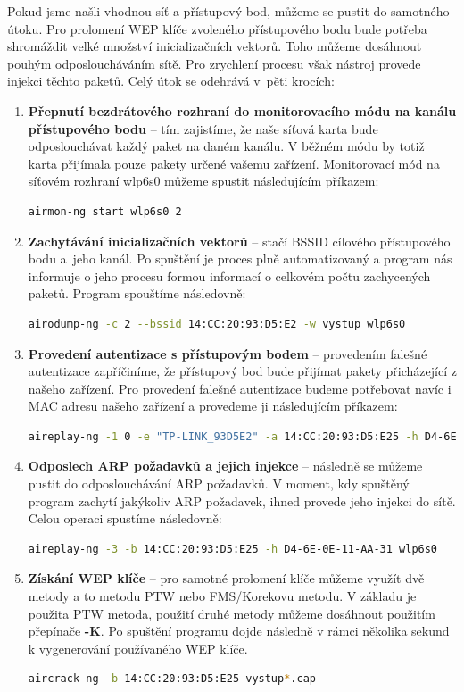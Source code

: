 Pokud jsme našli vhodnou síť a přístupový bod, můžeme se pustit do samotného útoku. Pro prolomení WEP klíče zvoleného přístupového bodu bude potřeba shromáždit velké množství inicializačních vektorů. Toho můžeme dosáhnout pouhým odposloucháváním sítě. Pro zrychlení procesu však nástroj provede injekci těchto paketů. Celý útok se odehrává v~pěti krocích:
\begin{enumerate}
  \item{\textbf{Přepnutí bezdrátového rozhraní do monitorovacího módu na kanálu přístupového bodu} -- tím zajistíme, že naše síťová karta bude odposlouchávat každý paket na daném kanálu. V běžném módu by totiž karta přijímala pouze pakety určené vašemu zařízení. Monitorovací mód na síťovém rozhraní wlp6s0 můžeme spustit následujícím příkazem:
\begin{lstlisting}[language=bash]
airmon-ng start wlp6s0 2
\end{lstlisting}
  }
  \item{\textbf{Zachytávání inicializačních vektorů} -- stačí BSSID cílového přístupového bodu a~jeho kanál. Po spuštění je proces plně automatizovaný a program nás informuje o jeho procesu formou informací o celkovém počtu zachycených paketů. Program spouštíme následovně:
\begin{lstlisting}[language=bash]
airodump-ng -c 2 --bssid 14:CC:20:93:D5:E2 -w vystup wlp6s0
\end{lstlisting}
  }
  \item{\textbf{Provedení autentizace s přístupovým bodem} -- provedením falešné autentizace zapříčiníme, že přístupový bod bude přijímat pakety přicházející z našeho zařízení. Pro provedení falešné autentizace budeme potřebovat navíc i MAC adresu našeho zařízení a provedeme ji následujícím příkazem:
\begin{lstlisting}[language=bash]
aireplay-ng -1 0 -e "TP-LINK_93D5E2" -a 14:CC:20:93:D5:E25 -h D4-6E-0E-11-AA-31
\end{lstlisting}
  }
  \item{\textbf{Odposlech ARP požadavků a jejich injekce} -- následně se můžeme pustit do odposlouchávání ARP požadavků. V moment, kdy spuštěný program zachytí jakýkoliv ARP požadavek, ihned provede jeho injekci do sítě. Celou operaci spustíme následovně:
\begin{lstlisting}[language=bash]
aireplay-ng -3 -b 14:CC:20:93:D5:E25 -h D4-6E-0E-11-AA-31 wlp6s0
\end{lstlisting}
  }
  \item{\textbf{Získání WEP klíče} -- pro samotné prolomení klíče můžeme využít dvě metody a to metodu PTW nebo FMS/Korekovu metodu. V základu je použita PTW metoda, použití druhé metody můžeme dosáhnout použitím přepínače \textbf{-K}. Po spuštění programu dojde následně v rámci několika sekund k vygenerování používaného WEP klíče. 
\begin{lstlisting}[language=bash]
aircrack-ng -b 14:CC:20:93:D5:E25 vystup*.cap
\end{lstlisting}
  }
\end{enumerate}

